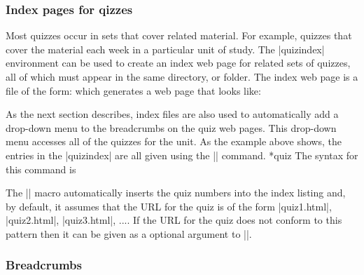 \documentclass[svgnames]{article}
\begin{document}
  \subsubsection{Index pages for qizzes}\label{SS:index}


    Most quizzes occur in sets that cover related material. For example,
    quizzes that cover the material each week in a particular unit of
    study. The \LatexCode|quizindex| environment can be used to create an
    index web page for related sets of quizzes, all of which must appear in the same
    directory, or folder. The index web page is a \WebQuiz file of the
    form:
    which generates a web page that looks like:

    As the next section describes, index files are also used to
    automatically add a drop-down menu to the breadcrumbs on the quiz web
    pages. This drop-down menu accesses all of the quizzes for the unit.
    As the example above shows, the entries in the \LatexCode|quizindex| are all
    given using the \LatexCode|\quiz| command.
    *{quiz}
    The syntax for this command is

    \begin{latexcode}
    \end{latexcode}

    \noindent The \LatexCode|\quiz| macro automatically inserts the quiz
    numbers into the index listing and, by default, it assumes that the
    URL for the quiz is of the form \BashCode|quiz1.html|,
    \BashCode|quiz2.html|, \BashCode|quiz3.html|, .... If the URL for the quiz
    does not conform to this pattern then it can be given as a optional
    argument to \LatexCode|\quiz|.

    \subsubsection{Breadcrumbs}\label{SS:breadcrumbs}
\end{document}
